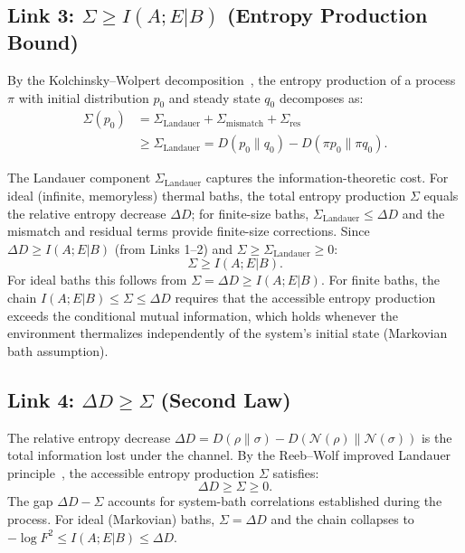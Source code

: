 \documentclass[prl,twocolumn,superscriptaddress,longbibliography]{revtex4-2}
\newcommand{\chan}{\mathcal{N}}
\begin{document}
\subsection{Link 3: $\Sigma \geq I(A;E|B)$ (Entropy Production Bound)}

By the Kolchinsky--Wolpert decomposition~\cite{Kolchinsky2017}, the
entropy production of a process $\pi$ with initial distribution $p_0$
and steady state $q_0$ decomposes as:
\begin{align}
\Sigma(p_0) &= \Sigma_{\mathrm{Landauer}} + \Sigma_{\mathrm{mismatch}}
+ \Sigma_{\mathrm{res}} \\
&\geq \Sigma_{\mathrm{Landauer}} = D(p_0\|q_0) - D(\pi p_0\|\pi q_0).
\end{align}

The Landauer component $\Sigma_{\mathrm{Landauer}}$ captures the
information-theoretic cost.  For ideal (infinite, memoryless) thermal
baths, the total entropy production $\Sigma$ equals the relative entropy
decrease $\Delta D$; for finite-size baths,
$\Sigma_{\mathrm{Landauer}} \leq \Delta D$ and the mismatch and
residual terms provide finite-size corrections.
Since $\Delta D \geq I(A;E|B)$ (from Links 1--2) and
$\Sigma \geq \Sigma_{\mathrm{Landauer}} \geq 0$:
\begin{equation}
\Sigma \geq I(A;E|B).
\end{equation}
For ideal baths this follows from $\Sigma = \Delta D \geq I(A;E|B)$.
For finite baths, the chain $I(A;E|B) \leq \Sigma \leq \Delta D$
requires that the accessible entropy production exceeds the conditional
mutual information, which holds whenever the environment thermalizes
independently of the system's initial state (Markovian bath
assumption).

\subsection{Link 4: $\Delta D \geq \Sigma$ (Second Law)}

The relative entropy decrease $\Delta D = D(\rho\|\sigma) -
D(\chan(\rho)\|\chan(\sigma))$ is the total information lost under the
channel. By the Reeb--Wolf improved Landauer
principle~\cite{ReebWolf2014}, the accessible entropy production
$\Sigma$ satisfies:
\begin{equation}
\Delta D \geq \Sigma \geq 0.
\end{equation}
The gap $\Delta D - \Sigma$ accounts for system-bath correlations
established during the process.  For ideal (Markovian) baths,
$\Sigma = \Delta D$ and the chain collapses to
$-\log F^2 \leq I(A;E|B) \leq \Delta D$.
\end{document}
